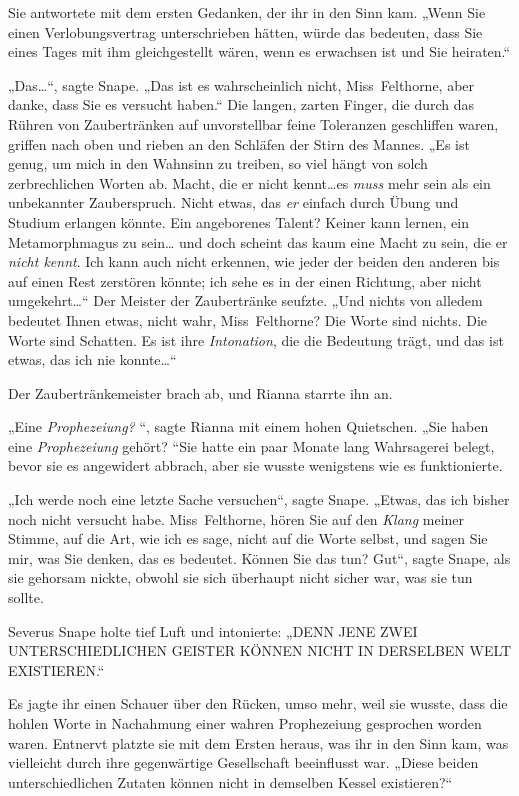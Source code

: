 {Sie antwortete mit dem ersten Gedanken, der ihr in den Sinn kam. „Wenn Sie einen Verlobungsvertrag unterschrieben hätten, würde das bedeuten, dass Sie eines Tages mit ihm gleichgestellt wären, wenn es erwachsen ist und Sie heiraten.“

„Das…“, sagte Snape. „Das ist es wahrscheinlich nicht, Miss~Felthorne, aber danke, dass Sie es versucht haben.“ Die langen, zarten Finger, die durch das Rühren von Zaubertränken auf unvorstellbar feine Toleranzen geschliffen waren, griffen nach oben und rieben an den Schläfen der Stirn des Mannes. „Es ist genug, um mich in den Wahnsinn zu treiben, so viel hängt von solch zerbrechlichen Worten ab. Macht, die er nicht kennt…es \emph{muss} mehr sein als ein unbekannter Zauberspruch. Nicht etwas, das \emph{er} einfach durch Übung und Studium erlangen könnte. Ein angeborenes Talent? Keiner kann lernen, ein Metamorphmagus zu sein… und doch scheint das kaum eine Macht zu sein, die er \emph{nicht kennt}. Ich kann auch nicht erkennen, wie jeder der beiden den anderen bis auf einen Rest zerstören könnte; ich sehe es in der einen Richtung, aber nicht umgekehrt…“ Der Meister der Zaubertränke seufzte. „Und nichts von alledem bedeutet Ihnen etwas, nicht wahr, Miss~Felthorne? Die Worte sind nichts. Die Worte sind Schatten. Es ist ihre \emph{Intonation}, die die Bedeutung trägt, und das ist etwas, das ich nie konnte…“

Der Zaubertränkemeister brach ab, und Rianna starrte ihn an.

„Eine \emph{Prophezeiung?} “, sagte Rianna mit einem hohen Quietschen. „Sie haben eine \emph{Prophezeiung} gehört? “Sie hatte ein paar Monate lang Wahrsagerei belegt, bevor sie es angewidert abbrach, aber sie wusste wenigstens wie es funktionierte.

„Ich werde noch eine letzte Sache versuchen“, sagte Snape. „Etwas, das ich bisher noch nicht versucht habe. Miss~Felthorne, hören Sie auf den \emph{Klang} meiner Stimme, auf die Art, wie ich es sage, nicht auf die Worte selbst, und sagen Sie mir, was Sie denken, das es bedeutet. Können Sie das tun? Gut“, sagte Snape, als sie gehorsam nickte, obwohl sie sich überhaupt nicht sicher war, was sie tun sollte.

Severus Snape holte tief Luft und intonierte: „DENN JENE ZWEI UNTERSCHIEDLICHEN GEISTER KÖNNEN NICHT IN DERSELBEN WELT EXISTIEREN.“

Es jagte ihr einen Schauer über den Rücken, umso mehr, weil sie wusste, dass die hohlen Worte in Nachahmung einer wahren Prophezeiung gesprochen worden waren. Entnervt platzte sie mit dem Ersten heraus, was ihr in den Sinn kam, was vielleicht durch ihre gegenwärtige Gesellschaft beeinflusst war. „Diese beiden unterschiedlichen Zutaten können nicht in demselben Kessel existieren?“

}
